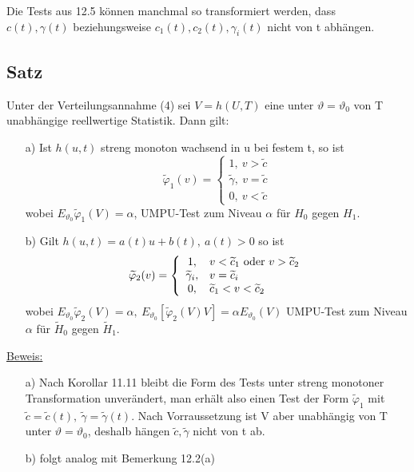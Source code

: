 \documentclass[a4paper,11pt,twoside,titlepage]{article}
\begin{document}
Die Tests aus 12.5 können manchmal so transformiert werden, dass\\
$c(t),\gamma(t)$ beziehungsweise $c_1(t),c_2(t),\gamma_i(t)$ nicht von t abhängen.

\subsection{Satz}
Unter der Verteilungsannahme (4) sei $V=h(U,T)$ eine unter $\vartheta=\vartheta_0$ von T
unabhängige reellwertige Statistik. Dann gilt:
\begin{itemize}
\item[a) ]Ist $h(u,t)$ streng monoton wachsend in u bei festem t,
so ist 
$$\widetilde\varphi_1(v)=\left\{\begin{matrix}
1,\ v>\widetilde{c}\\\widetilde\gamma,\ v=\widetilde{c}\\0,\ v<\widetilde{c}\end{matrix}\right.$$
wobei $E_{\vartheta_0}\widetilde\varphi_1(V)=\alpha$, UMPU-Test zum Niveau $\alpha$ für $H_0$ gegen $H_1$.
\item[b) ]Gilt $h(u,t)=a(t)u+b(t),\ a(t)>0$ so ist
$$\widetilde\varphi_2(v)=\left\{\begin{array}{cl}
1,&v<\widetilde{c}_1\textnormal{ oder }v>\widetilde{c}_2\\\widetilde\gamma_i,&v=\widetilde{c}_i\\0,&\widetilde{c}_1<v<\widetilde{c}_2\end{array}\right.$$
wobei $E_{\vartheta_0}\widetilde\varphi_2(V)=\alpha,\ E_{\vartheta_0}[\widetilde\varphi_2(V)V]=\alpha 
E_{\vartheta_0}(V)$
UMPU-Test zum Niveau $\alpha$ für $\widetilde{H}_0$ gegen $\widetilde{H}_1$.
\end{itemize}

\underline{Beweis:}
\begin{itemize}
\item[a) ]Nach Korollar 11.11 bleibt die Form des Tests unter streng monotoner
Transformation unverändert, man erhält also einen Test der Form $\widetilde\varphi_1$ mit
$\widetilde{c}=\widetilde{c}(t),\ \widetilde\gamma=\widetilde\gamma(t)$. Nach Vorraussetzung
ist V aber unabhängig von T unter $\vartheta=\vartheta_0$, deshalb hängen $\widetilde{c},\widetilde\gamma$
 nicht von t ab.
 \item[b) ] folgt analog mit Bemerkung 12.2(a)
\end{itemize}
 
\end{document}
